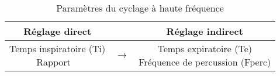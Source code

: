 \begin{table*}[h]
	\centering
	\caption{Paramètres du cyclage à haute fréquence}
	\begin{tabular}{ccc}
		\hline
		Réglage direct & & Réglage indirect\\
		\hline
		\parbox{3.7cm}{
			\raggedright
			Temps inspiratoire (Ti)\\
			Rapport \ie\
			} & $\rightarrow$ & \parbox{5cm}{
				\raggedright
				Temps expiratoire (Te)\\
				Fréquence de percussion (Fperc)
				}\\
				\hline
	\end{tabular}
\end{table*}
